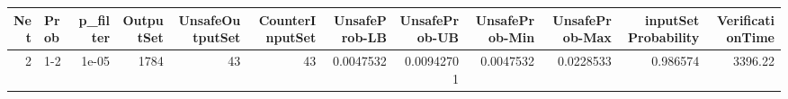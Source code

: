 \begin{tabular}{rlrrrrrrrrrr}
\hline
   Net & Prob   &   p\_filter &   OutputSet &   UnsafeOutputSet &   CounterInputSet &   UnsafeProb-LB &   UnsafeProb-UB &   UnsafeProb-Min &   UnsafeProb-Max &   inputSet Probability &   VerificationTime \\
\hline
     2 & 1-2    &      1e-05 &        1784 &                43 &                43 &       0.0047532 &      0.00942701 &        0.0047532 &        0.0228533 &               0.986574 &            3396.22 \\
\hline
\end{tabular}
